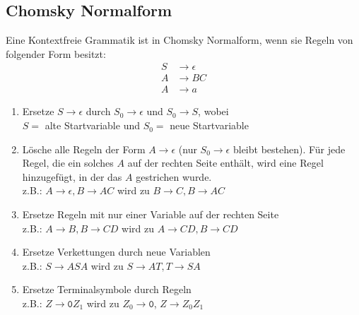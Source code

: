 \documentclass[a4paper]{article}
\begin{document}
\subsection{Chomsky Normalform}
	\begin{multicols}{2}
	
	\begin{fdef}[Definition]
	Eine Kontextfreie Grammatik ist in Chomsky Normalform, wenn sie Regeln von folgender Form besitzt:
	\begin{align*}
		S & \rightarrow \epsilon \\
		A & \rightarrow BC \\
		A & \rightarrow a
	\end{align*}
	\end{fdef}	
	
	\begin{falgo}
		\begin{enumerate}
			\item Ersetze $S \rightarrow \epsilon$ durch $S_0 \rightarrow \epsilon$ und $S_0 \rightarrow S$, wobei \\
			$S =$ alte Startvariable und $S_0 =$ neue Startvariable
			\item Lösche alle Regeln der Form $A \rightarrow \epsilon$ (nur $S_0 \rightarrow \epsilon$ bleibt bestehen). Für jede Regel, die ein solches $A$ auf der rechten Seite enthält, wird eine Regel hinzugefügt, in der das $A$ gestrichen wurde.\\
			      z.B.: $A \rightarrow \epsilon, B \rightarrow AC$ wird zu $B \rightarrow C, B \rightarrow AC$
			\item Ersetze Regeln mit nur einer Variable auf der rechten Seite \\
			      z.B.: $A \rightarrow B, B \rightarrow CD$ wird zu $A \rightarrow CD, B \rightarrow CD$
			\item Ersetze Verkettungen durch neue Variablen \\
			      z.B.: $S \rightarrow ASA$ wird zu $S \rightarrow AT, T \rightarrow SA$
			\item Ersetze Terminalsymbole durch Regeln \\
				  z.B.: $Z \rightarrow \texttt{0}Z_1$ wird zu $Z_0 \rightarrow \texttt{0}$, $Z \rightarrow Z_0Z_1$
		\end{enumerate}
	\end{falgo}
	
	\end{multicols}	
	
\end{document}
